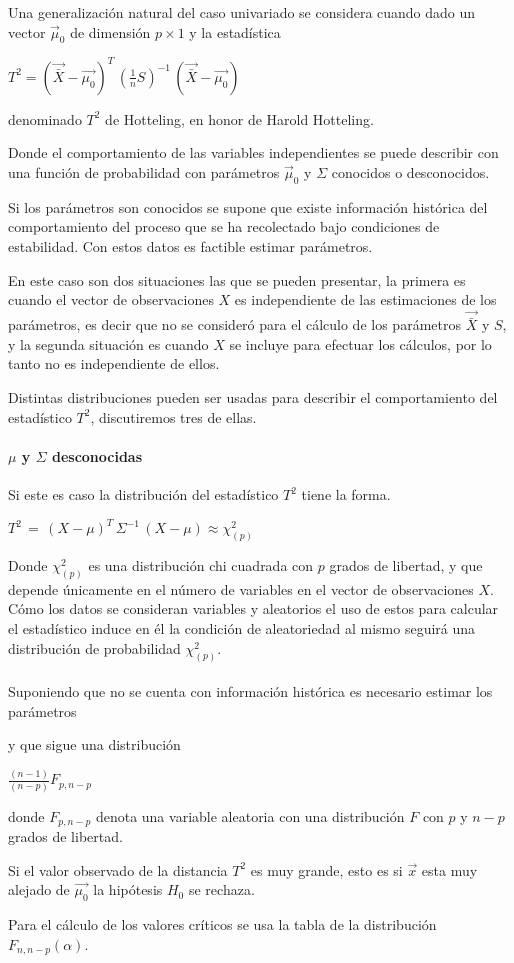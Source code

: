 \documentclass[english]{report}
\begin{document}
Una generalización natural del caso univariado se considera cuando dado un vector $\vec{\mu}_0$ de dimensión $p\times 1$ y la estadística

$T^2 =(\vec{\bar{X}}-\vec{\mu_0})^T\,(\frac{1}{n}S)^{-1}\,(\vec{\bar{X}}-\vec{\mu_0})$

denominado $T^2$ de Hotteling, en honor de Harold Hotteling. 

Donde el comportamiento de las variables independientes se puede describir con una función de probabilidad con parámetros $\vec{\mu}_0$ y $\Sigma$ conocidos o desconocidos.

Si los parámetros son conocidos se supone que existe información histórica del comportamiento del proceso que se ha recolectado bajo condiciones de estabilidad. Con estos datos es factible estimar parámetros.

En este caso son dos situaciones las que se pueden presentar, la primera es cuando el vector de observaciones $X$ es independiente de las estimaciones de los parámetros, es decir que no se consideró para el cálculo de los parámetros $\vec{\bar{X}}$ y $S$, y la segunda situación es cuando $X$ se incluye para efectuar los cálculos, por lo tanto no es independiente de ellos.

Distintas distribuciones pueden ser usadas para describir el comportamiento del estadístico $T^2$, discutiremos tres de ellas.

\paragraph{$\mu$ y $\Sigma$ desconocidas}

Si este es caso la distribución del estadístico  $T^2$ tiene la forma.

$T^2\,=\,(X-\mu)^T\,\Sigma^{-1}\,(X-\mu) \approx \chi_(p)^2$

Donde $\chi_(p)^2$ es una distribución chi cuadrada con $p$ grados de libertad, y que depende únicamente en el número de variables en el vector de observaciones $X$. Cómo los datos se consideran variables y aleatorios el uso de estos para calcular el estadístico induce en él la condición de aleatoriedad al mismo seguirá una distribución de probabilidad $\chi_(p)^2$.

\paragraph{} 

Suponiendo que no se cuenta con información histórica es necesario estimar los parámetros 


y que sigue una distribución

$\frac{(n-1)}{(n-p)}F_{p,n-p}$

donde $F_{p,n-p}$ denota una variable aleatoria con una distribución $F$ con $p$ y $n-p$ grados de libertad.

Si el valor observado de la distancia $T^2$ es muy grande, esto es si $\vec{x}$ esta muy alejado de $\vec{\mu_0}$ la hipótesis $H_0$ se rechaza.

Para el cálculo de los valores críticos se usa la tabla de la distribución $F_{n,n-p}(\alpha)$.
\end{document}
